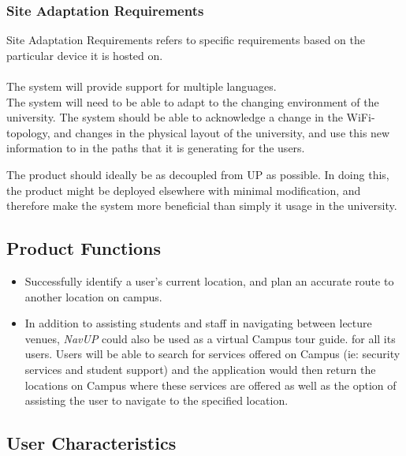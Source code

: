 \documentclass[12pt,a4paper]{article}
\begin{document}
			\subsubsection{Site Adaptation Requirements}
			
				Site Adaptation Requirements refers to specific requirements based on the particular 
				device it is hosted on.\\\\
				The system will provide support for multiple languages.\\

				The system will need to be able to adapt to the changing environment of
				the university. The system should be able to acknowledge a change in the
				WiFi-topology, and changes in the physical layout of the university, and
				use this new information to in the paths that it is generating for the
				users.


				The product should ideally be as decoupled from UP as possible. In doing
				this, the product might be deployed elsewhere with minimal modification,
				and therefore make the system more beneficial than simply it usage in
				the university.


		\subsection{Product Functions}

			\begin{itemize}
				\item Successfully identify a user's current location, and plan an
							accurate route to another location on campus.
							
				\item In addition to assisting students and staff in navigating between lecture venues, 					\textit{NavUP} could also be used as a virtual Campus tour guide. for all its users. Users will 				be able to search for services offered on Campus (ie: security services and student support) 					and the application would then return the locations on Campus where these services are offered 					as well as the option of assisting the user to navigate to the specified location.
			\end{itemize}

		\subsection{User Characteristics}
			
\end{document}
